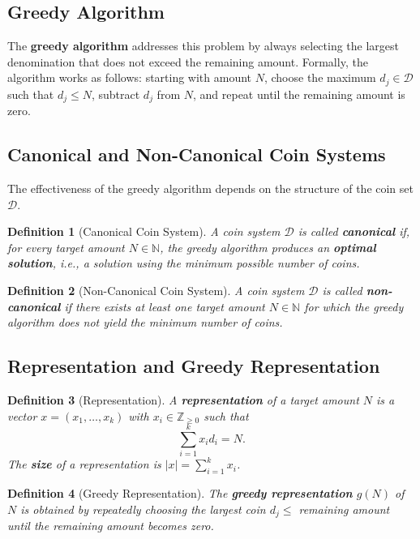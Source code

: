 \documentclass[12pt,a4paper]{report}
\newtheorem{definition}{Definition}
\begin{document}
\subsection{Greedy Algorithm}

The \textbf{greedy algorithm} addresses this problem by always selecting the largest denomination that does not exceed the remaining amount. Formally, the algorithm works as follows: starting with amount $N$, choose the maximum $d_j \in \mathcal{D}$ such that $d_j \leq N$, subtract $d_j$ from $N$, and repeat until the remaining amount is zero.

\subsection{Canonical and Non-Canonical Coin Systems}

The effectiveness of the greedy algorithm depends on the structure of the coin set $\mathcal{D}$.\cite{cai2008}

\begin{definition}[Canonical Coin System]
A coin system $\mathcal{D}$ is called \textbf{canonical} if, for every target amount $N \in \mathbb{N}$, the greedy algorithm produces an \textbf{optimal solution}, i.e., a solution using the minimum possible number of coins.
\end{definition}

\begin{definition}[Non-Canonical Coin System]
A coin system $\mathcal{D}$ is called \textbf{non-canonical} if there exists at least one target amount $N \in \mathbb{N}$ for which the greedy algorithm does not yield the minimum number of coins.
\end{definition}

\subsection{Representation and Greedy Representation}

\begin{definition}[Representation]
A \textbf{representation} of a target amount $N$ is a vector $x = (x_1, \dots, x_k)$ with $x_i \in \mathbb{Z}_{\ge 0}$ such that
\[
\sum_{i=1}^{k} x_i d_i = N.
\]
The \textbf{size} of a representation is $|x| = \sum_{i=1}^{k} x_i$.
\end{definition}

\begin{definition}[Greedy Representation]
The \textbf{greedy representation} $g(N)$ of $N$ is obtained by repeatedly choosing the largest coin $d_j \le$ remaining amount until the remaining amount becomes zero.
\end{definition}
\end{document}
